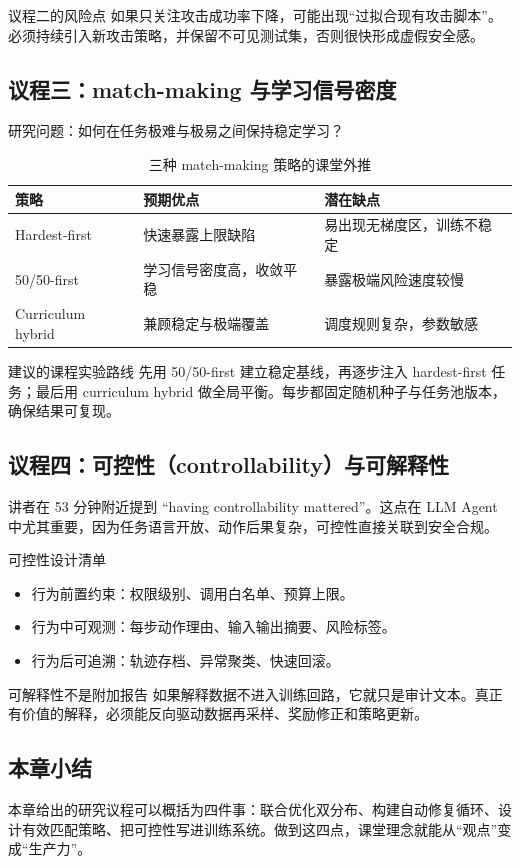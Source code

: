 \begin{warningbox}{议程二的风险点}
如果只关注攻击成功率下降，可能出现``过拟合现有攻击脚本''。必须持续引入新攻击策略，并保留不可见测试集，否则很快形成虚假安全感。
\end{warningbox}

\subsection{议程三：match-making 与学习信号密度}
研究问题：如何在任务极难与极易之间保持稳定学习？

\begin{table}[H]
\centering
\caption{三种 match-making 策略的课堂外推}
\begin{tabular}{p{3.0cm}p{4.0cm}p{5.6cm}}
\toprule
策略 & 预期优点 & 潜在缺点 \\
\midrule
Hardest-first & 快速暴露上限缺陷 & 易出现无梯度区，训练不稳定 \\
50/50-first & 学习信号密度高，收敛平稳 & 暴露极端风险速度较慢 \\
Curriculum hybrid & 兼顾稳定与极端覆盖 & 调度规则复杂，参数敏感 \\
\bottomrule
\end{tabular}
\end{table}

\begin{knowledgebox}{建议的课程实验路线}
先用 50/50-first 建立稳定基线，再逐步注入 hardest-first 任务；最后用 curriculum hybrid 做全局平衡。每步都固定随机种子与任务池版本，确保结果可复现。
\end{knowledgebox}

\subsection{议程四：可控性（controllability）与可解释性}
讲者在 53 分钟附近提到 ``having controllability mattered''。这点在 LLM Agent 中尤其重要，因为任务语言开放、动作后果复杂，可控性直接关联到安全合规。

\begin{importantbox}{可控性设计清单}
\begin{itemize}
    \item 行为前置约束：权限级别、调用白名单、预算上限。
    \item 行为中可观测：每步动作理由、输入输出摘要、风险标签。
    \item 行为后可追溯：轨迹存档、异常聚类、快速回滚。
\end{itemize}
\end{importantbox}

\begin{warningbox}{可解释性不是附加报告}
如果解释数据不进入训练回路，它就只是审计文本。真正有价值的解释，必须能反向驱动数据再采样、奖励修正和策略更新。
\end{warningbox}

\subsection{本章小结}
本章给出的研究议程可以概括为四件事：联合优化双分布、构建自动修复循环、设计有效匹配策略、把可控性写进训练系统。做到这四点，课堂理念就能从``观点''变成``生产力''。

